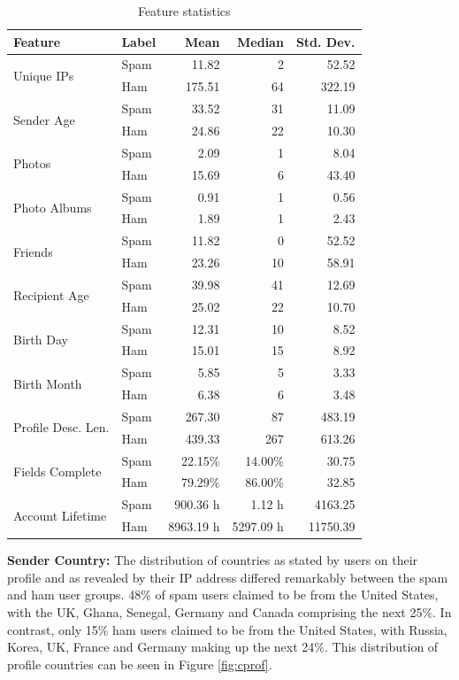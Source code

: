 \documentclass[preprint]{acm_proc_article-sp}
\begin{document}
\begin{table}
\small
\begin{tabular}{|l|l|r|r|r|}
    \hline
    \textbf{Feature} & \textbf{Label} & \textbf{Mean} & \textbf{Median} & \textbf{Std. Dev.}\\
    \hline
    \multirow{2}{*}{Unique IPs} & Spam & 11.82 & 2 & 52.52\\
    & Ham & 175.51 & 64 & 322.19\\
    \hline
    \multirow{2}{*}{Sender Age} & Spam & 33.52 & 31 & 11.09\\
    & Ham & 24.86 & 22 & 10.30\\
    \hline
    \multirow{2}{*}{Photos} & Spam & 2.09 & 1 & 8.04\\
    & Ham & 15.69 & 6 & 43.40\\
    \hline
    \multirow{2}{*}{Photo Albums} & Spam & 0.91 & 1 & 0.56\\
    & Ham & 1.89 & 1 & 2.43\\
    \hline
    \multirow{2}{*}{Friends} & Spam & 11.82 & 0 & 52.52\\
    & Ham & 23.26 & 10 & 58.91\\
    \hline
    \multirow{2}{*}{Recipient Age} & Spam & 39.98 & 41 & 12.69\\
    & Ham & 25.02 & 22 & 10.70\\
    \hline
    \multirow{2}{*}{Birth Day} & Spam & 12.31 & 10 & 8.52\\
    & Ham & 15.01 & 15 & 8.92\\
    \hline
    \multirow{2}{*}{Birth Month} & Spam & 5.85 & 5 & 3.33\\
    & Ham & 6.38 & 6 & 3.48\\
    \hline
    \multirow{2}{*}{Profile Desc. Len.} & Spam & 267.30 & 87 & 483.19\\
    & Ham & 439.33 & 267 & 613.26\\
    \hline
    \multirow{2}{*}{Fields Complete} & Spam & 22.15\% & 14.00\% & 30.75\\
    & Ham & 79.29\% & 86.00\% & 32.85\\
    \hline
    \multirow{2}{*}{Account Lifetime} & Spam & 900.36 h & 1.12 h & 4163.25\\
    & Ham & 8963.19 h & 5297.09 h & 11750.39 \\
    \hline
\end{tabular}
\caption{Feature statistics}
\label{tab:feats}
\end{table}

\textbf{Sender Country:} The distribution of countries as stated by users on their profile and as 
revealed by their IP address differed remarkably between the spam and ham user groups. 
48\% of spam users claimed to be from the United States, with the UK, Ghana, Senegal, 
Germany and Canada comprising the next 25\%.  In contrast, only 15\% ham users claimed to be 
from the United States, with Russia, Korea, UK, France and Germany making up the next 24\%. 
This distribution of profile countries can be seen in Figure \ref{fig:cprof}.
\end{document}
